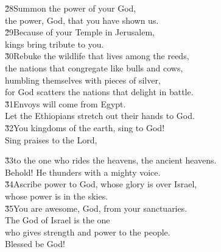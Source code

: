 \begin{poetry}
\poeml \v{28}Summon the power of your God, \\
\poemll    the power, God, that you have shown us. \\
\poeml \v{29}Because of your Temple in Jerusalem, \\
\poemll    kings bring tribute to you. \\
\poeml \v{30}Rebuke the wildlife that lives among the reeds, \\
\poemll    the nations that congregate like bulls and cows, \\
\poeml humbling themselves with pieces of silver, \\
\poemll    for God scatters the nations that delight in battle. \\
\poeml \v{31}Envoys will come from Egypt. \\
\poemll    Let the Ethiopians stretch out their hands to God. \\
\poeml \v{32}You kingdoms of the earth, sing to God! \\
\poemll    Sing praises to the Lord,
\end{poetry}

\begin{poetry}
\poeml \v{33}to the one who rides the heavens, the ancient heavens. \\
\poemll    Behold! He thunders with a mighty voice. \\
\poeml \v{34}Ascribe power to God, whose glory is over Israel, \\
\poemll    whose power is in the skies. \\
\poeml \v{35}You are awesome, God, from your sanctuaries. \\
\poemll    The God of Israel is the one \\
\poemlll       who gives strength and power to the people. \\
\poeml Blessed be God!
\end{poetry}

